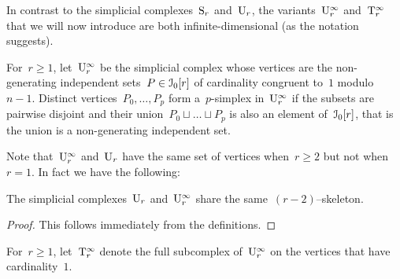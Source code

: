 In contrast to the simplicial complexes~$\mathrm{S}_r$ and~$\mathrm{U}_r$, the variants~$\mathrm{U}_r^{\infty}$ and~$\mathrm{T}_r^\infty$ that we will now introduce are both infinite-dimensional (as the notation suggests).

\begin{definition}\label{def:infty}
For~$r\geqslant1$, let~$\mathrm{U}_r^{\infty}$ be the simplicial complex whose vertices are the non-generating independent sets~$P\in \mathcal{I}_0[r]$ of cardinality congruent to~$1$ modulo~$n-1$. Distinct vertices~$P_0,\dots,P_p$ form a~$p$-simplex in~$\mathrm{U}_r^{\infty}$ if the subsets are pairwise disjoint and their union~$P_0\sqcup\dots\sqcup P_p$ is also an element of~$\mathcal{I}_0[r]$, that is the union is  a non-generating independent set. 
\end{definition} 

Note that~$\mathrm{U}_r^\infty$ and~$\mathrm{U}_r$ have the same set of vertices when~$r\geqslant2$ but not when~\hbox{$r=1$}. In fact we have the following: 

\begin{lemma}\label{lem:skeleton}
The simplicial complexes~$\mathrm{U}_r$ and~$\mathrm{U}_r^\infty$ share the same~\hbox{$(r-2)$}--skeleton. 
\end{lemma}

\begin{proof}
This follows immediately from the definitions. 
\end{proof}

\begin{definition}\label{def:infty,0}
For~$r\geqslant1$, let~$\mathrm{T}_r^\infty$ denote the full subcomplex of~$\mathrm{U}_r^\infty$ on the vertices that have cardinality~$1$.
\end{definition} 


